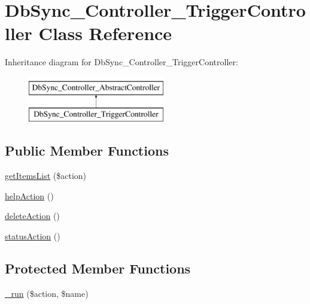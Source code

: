 \hypertarget{classDbSync__Controller__TriggerController}{
\section{DbSync\_\-Controller\_\-TriggerController Class Reference}
\label{classDbSync__Controller__TriggerController}
}
Inheritance diagram for DbSync\_\-Controller\_\-TriggerController:\begin{figure}[H]
\begin{center}
\leavevmode
\includegraphics[height=2.000000cm]{classDbSync__Controller__TriggerController}
\end{center}
\end{figure}
\subsection*{Public Member Functions}
\begin{DoxyCompactItemize}
\item 
\hyperlink{classDbSync__Controller__TriggerController_a18f4eb165243504cf1354464be4ec9de}{getItemsList} (\$action)
\item 
\hyperlink{classDbSync__Controller__TriggerController_a4d53a691eb15f7d060c4db5d14e8c240}{helpAction} ()
\item 
\hyperlink{classDbSync__Controller__TriggerController_af0518cd0c76d9ae0a20b44d2a1c311b0}{deleteAction} ()
\item 
\hyperlink{classDbSync__Controller__TriggerController_a08d8439a825dd363b7fb8df076056f65}{statusAction} ()
\end{DoxyCompactItemize}
\subsection*{Protected Member Functions}
\begin{DoxyCompactItemize}
\item 
\hyperlink{classDbSync__Controller__TriggerController_a2b8ff414b903fc7ac1a433d1f10e2b5a}{\_\-run} (\$action, \$name)
\end{DoxyCompactItemize}
